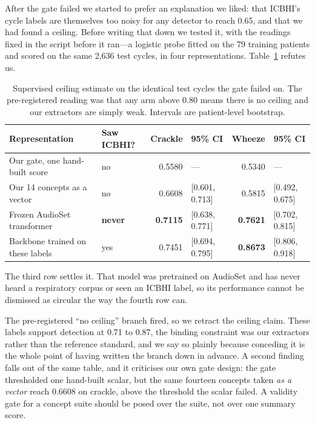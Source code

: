 \documentclass[journal,onecolumn]{IEEEtran}
\newcommand{\best}[1]{\textbf{#1}}
\begin{document}
After the gate failed we started to prefer an explanation we liked: that ICBHI's cycle labels
are themselves too noisy for any detector to reach 0.65, and that we had found a ceiling. Before
writing that down we tested it, with the readings fixed in the script before it ran---a logistic
probe fitted on the 79 training patients and scored on the same 2,636 test cycles, in four
representations. Table~\ref{tab:ceiling} refutes us.

\begin{table}[!t]
\centering
\caption{Supervised ceiling estimate on the identical test cycles the gate failed on. The
pre-registered reading was that any arm above 0.80 means there is no ceiling and our
extractors are simply weak. Intervals are patient-level bootstrap.}
\label{tab:ceiling}
\footnotesize
\begin{tabular}{llrlrl}
\toprule
Representation & Saw ICBHI? & Crackle & 95\% CI & Wheeze & 95\% CI \\
\midrule
Our gate, one hand-built score & no & 0.5580 & --- & 0.5340 & --- \\
Our 14 concepts as a vector & no & 0.6608 & [0.601, 0.713] & 0.5815 & [0.492, 0.675] \\
Frozen AudioSet transformer & \best{never} & \best{0.7115} & [0.638, 0.771] & \best{0.7621} & [0.702, 0.815] \\
Backbone trained on these labels & yes & 0.7451 & [0.694, 0.795] & \best{0.8673} & [0.806, 0.918] \\
\bottomrule
\end{tabular}

\vspace{2pt}
\footnotesize The third row settles it. That model was pretrained on AudioSet and has never
heard a respiratory corpus or seen an ICBHI label, so its performance cannot be dismissed as
circular the way the fourth row can.
\end{table}

The pre-registered ``no ceiling'' branch fired, so we retract the ceiling claim. These labels
support detection at 0.71 to 0.87, the binding constraint was our extractors rather than the
reference standard, and we say so plainly because conceding it is the whole point of having
written the branch down in advance. A second finding falls out of the same table, and it
criticises our own gate design: the gate thresholded one hand-built scalar, but the same
fourteen concepts taken \emph{as a vector} reach 0.6608 on crackle, above the threshold the
scalar failed. A validity gate for a concept suite should be posed over the suite, not over
one summary score.
\end{document}
